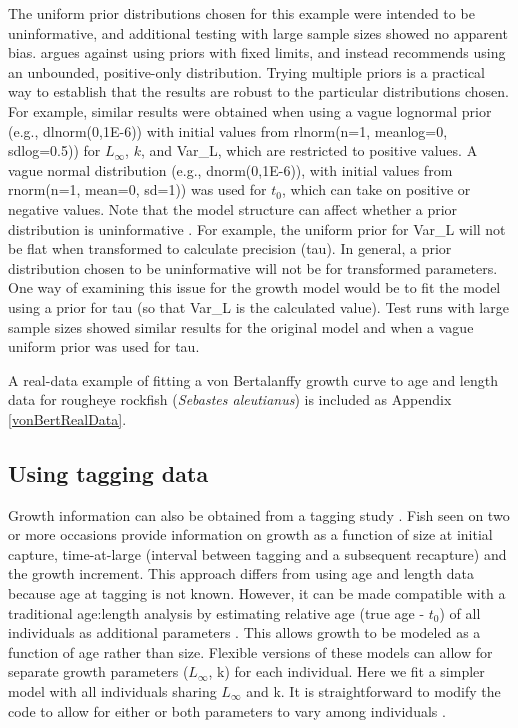 \documentclass[
]{krantz}
\begin{document}
The uniform prior distributions chosen for this example were intended to be uninformative, and additional testing with large sample sizes showed no apparent bias. \citet{lemoine_2019} argues against using priors with fixed limits, and instead recommends using an unbounded, positive-only distribution. Trying multiple priors is a practical way to establish that the results are robust to the particular distributions chosen. For example, similar results were obtained when using a vague lognormal prior (e.g., dlnorm(0,1E-6)) with initial values from rlnorm(n=1, meanlog=0, sdlog=0.5)) for \(L_\infty\), \(k\), and Var\_L, which are restricted to positive values. A vague normal distribution (e.g., dnorm(0,1E-6)), with initial values from rnorm(n=1, mean=0, sd=1)) was used for \(t_0\), which can take on positive or negative values. Note that the model structure can affect whether a prior distribution is uninformative \citep{mccarthy_2007}. For example, the uniform prior for Var\_L will not be flat when transformed to calculate precision (tau). In general, a prior distribution chosen to be uninformative will not be for transformed parameters. One way of examining this issue for the growth model would be to fit the model using a prior for tau (so that Var\_L is the calculated value). Test runs with large sample sizes showed similar results for the original model and when a vague uniform prior was used for tau.

A real-data example \citep{quinn.deriso_1999} of fitting a von Bertalanffy growth curve to age and length data for rougheye rockfish (\emph{Sebastes aleutianus}) is included as Appendix \ref{vonBertRealData}.

\hypertarget{GrowthInc}{%
\subsection{Using tagging data}\label{GrowthInc}}

Growth information can also be obtained from a tagging study \citep{wang.etal1995, zhang.etal2009, scherrer.etal2021}. Fish seen on two or more occasions provide information on growth as a function of size at initial capture, time-at-large (interval between tagging and a subsequent recapture) and the growth increment. This approach differs from using age and length data because age at tagging is not known. However, it can be made compatible with a traditional age:length analysis by estimating relative age (true age - \(t_0\)) of all individuals as additional parameters \citep{wang.etal1995, zhang.etal2009, scherrer.etal2021}. This allows growth to be modeled as a function of age rather than size. Flexible versions of these models can allow for separate growth parameters (\(L_\infty\), k) for each individual. Here we fit a simpler model \citep[Model 4 of][]{scherrer.etal2021} with all individuals sharing \(L_\infty\) and k. It is straightforward to modify the code to allow for either or both parameters to vary among individuals \citep{scherrer.etal2021}.
\end{document}
